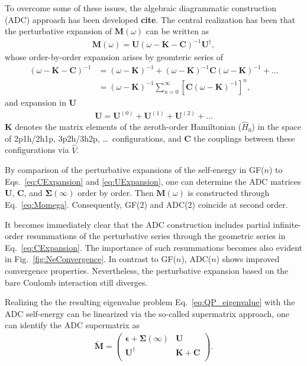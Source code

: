 \documentclass[aip,jcp,reprint,noshowkeys,superscriptaddress]{revtex4-2}
\newcommand{\bC}{\boldsymbol{C}}
\newcommand{\bM}{\boldsymbol{M}}
\newcommand{\bU}{\boldsymbol{U}}
\newcommand{\bK}{\boldsymbol{K}}
\begin{document}
To overcome some of these issues, the algebraic diagrammatic construction (ADC) approach has been developed \textbf{cite}.
The central realization has been that the perturbative expansion of $\bM(\omega)$ can be written as 
\begin{align}
    \bM(\omega) = \bU (\omega - \bK - \bC)^{-1} \bU^\dagger,
    \label{eq:Momega}
\end{align}
whose order-by-order expansion arises by geomteric series of
\begin{align}
    (\omega - \bK - \bC)^{-1} 
    &= (\omega - \bK)^{-1} + (\omega - \bK)^{-1} \bC (\omega - \bK)^{-1} + \dots \nonumber \\
    &= (\omega - \bK)^{-1} \sum_{n=0}^{\infty} \left[\bC (\omega - \bK)^{-1}\right]^n,
    \label{eq:CExpansion}
\end{align}
and expansion in $\bU$
\begin{align}
    \bU = \bU^{(0)} + \bU^{(1)} + \bU^{(2)} + \dots
    \label{eq:UExpansion} 
\end{align}
$\bK$ denotes the matrix elements of the zeroth-order Hamiltonian ($\hat{H}_0$) in the space of 2p1h/2h1p, 3p2h/3h2p, \dots\ configurations, and $\bC$ the couplings between these configurations via $\hat{V}$.

By comparison of the perturbative expansions of the self-energy in GF($n$) to Eqs.~\eqref{eq:CExpansion} and \eqref{eq:UExpansion}, one can determine the ADC matrices $\bU$, $\bC$, and $\pmb{\Sigma}(\infty)$ order by order.
Then $\bM(\omega)$ is constructed through Eq.~\eqref{eq:Momega}.
Consequently, GF($2$) and ADC($2$) coincide at second order.

It becomes immediately clear that the ADC construction includes partial infinite-order resummations of the perturbative series through the geometric series in Eq.~\eqref{eq:CExpansion}.
The importance of such resummations becomes also evident in Fig.~\ref{fig:NeConvergence}.
In contrast to GF($n$), ADC($n$) shows improved convergence properties.
Nevertheless, the perturbative expansion based on the bare Coulomb interaction still diverges.

Realizing the the resulting eigenvalue problem Eq.~\eqref{eq:QP_eigenvalue} with the ADC self-energy can be linearized via the so-called supermatrix approach, one can identify the ADC supermatrix as
\begin{align}
    \tilde{\mathbf{M}} =
    \begin{pmatrix}
        \pmb{\epsilon} + \pmb{\Sigma}(\infty) & \mathbf{U}\\
        \mathbf{U}^\dagger & \mathbf{K} + \mathbf{C} \\
    \end{pmatrix} .
    \label{eq:ISRunion}
\end{align}
\end{document}
